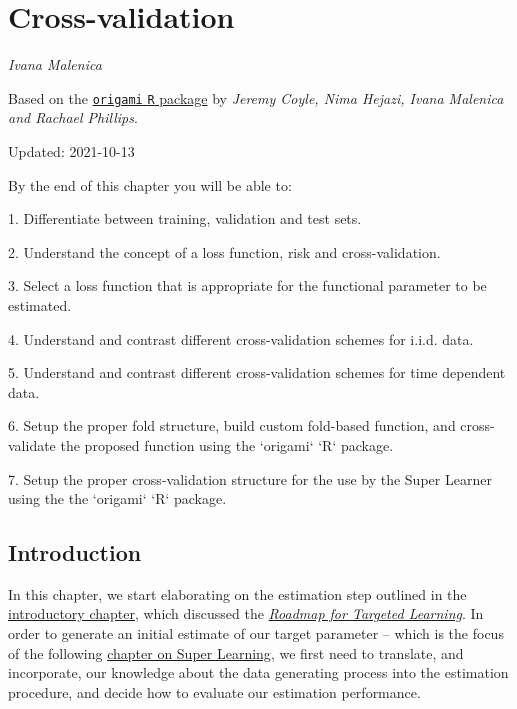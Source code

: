 \documentclass[
  12pt, krantz2,
]{krantz}
\newcommand{\passthrough}[1]{#1}
\theoremstyle{definition}
\theoremstyle{definition}
\theoremstyle{definition}
\newcommand{\1}{\mathbbm{1}}
\begin{document}
\hypertarget{origami}{%
\chapter{Cross-validation}\label{origami}}

\emph{Ivana Malenica}

Based on the \href{https://github.com/tlverse/origami}{\passthrough{\lstinline!origami!} \passthrough{\lstinline!R!} package}
by \emph{Jeremy Coyle, Nima Hejazi, Ivana Malenica and Rachael Phillips}.

Updated: 2021-10-13

\begin{VT1}



By the end of this chapter you will be able to:

1. Differentiate between training, validation and test sets.

2. Understand the concept of a loss function, risk and cross-validation.

3. Select a loss function that is appropriate for the functional parameter to be
   estimated.

4. Understand and contrast different cross-validation schemes for i.i.d. data.

5. Understand and contrast different cross-validation schemes for time dependent
   data.

6. Setup the proper fold structure, build custom fold-based function, and
   cross-validate the proposed function using the `origami` `R` package.

7. Setup the proper cross-validation structure for the use by the Super Learner
   using the the `origami` `R` package.

\end{VT1}

\hypertarget{introduction-1}{%
\section{Introduction}\label{introduction-1}}

In this chapter, we start elaborating on the estimation step outlined in the
\protect\hyperlink{intro}{introductory chapter}, which discussed the \protect\hyperlink{roadmap}{\emph{Roadmap for Targeted
Learning}}. In order to generate an initial estimate of our target
parameter -- which is the focus of the following \protect\hyperlink{sl3}{chapter on Super
Learning}, we first need to translate, and incorporate, our knowledge
about the data generating process into the estimation procedure, and decide how
to evaluate our estimation performance.
\end{document}
